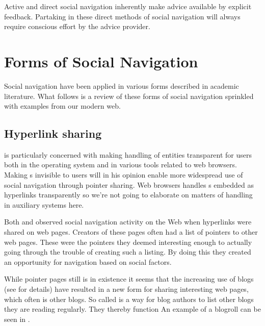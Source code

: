 Active and direct social navigation inherently make advice available by
explicit feedback. Partaking in these direct methods of social navigation
will always require conscious effort by the advice provider.

\section{Forms of Social Navigation}

Social navigation have been applied in various forms described in
academic literature. What follows is a review of these forms of social
navigation sprinkled with examples from our modern web.

\subsection{Hyperlink sharing}

\citet{dieberger97} is particularly concerned with making handling of
%
entities transparent for users both in the operating system and in various
tools related to web browsers. Making s invisible to users will in
his opinion enable more widespread use of social navigation through pointer
sharing. Web browsers handles s embedded as hyperlinks transparently
so we're not going to elaborate on matters of  handling in
auxiliary systems here.

Both \cite{dourish94} and \cite{dieberger97} observed social navigation
activity on the Web when hyperlinks were shared on web pages.
Creators of these pages often had a list of pointers to other web pages.
These were the pointers they deemed interesting enough to actually going
through the trouble of creating such a listing. By doing this they created
an opportunity for navigation based on social factors.

While pointer pages still is in existence it seems that the increasing
use of blogs (see  for details)
have resulted in a new form for sharing interesting web pages,
which often is other blogs. So called  is a way for blog
authors to list other blogs they are reading regularly. They thereby function
An example of a blogroll can be seen in .

